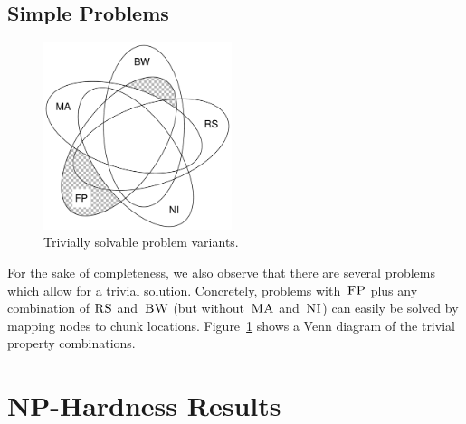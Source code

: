 \documentclass[preprint,12pt]{elsarticle}
\newcommand{\CC}{\textsc{NI}}
\newcommand{\FP}{\textsc{FP}}
\newcommand{\RS}{\textsc{RS}}
\newcommand{\BW}{\textsc{BW}}
\newcommand{\MA}{\textsc{MA}}
\begin{document}



\subsection{Simple Problems}

\begin{figure}
\centering
\includegraphics[width=0.49\textwidth]{figs/venn_trivial.pdf}
\caption{Trivially solvable problem variants.}
\label{fig:venn_trivial}
\end{figure}


For the sake of completeness, we also observe that there are
several problems which
allow for a trivial solution. Concretely, problems with~$\FP$
plus any combination of
$\RS$ and~$\BW$ (but without~$\MA$ and~$\CC$) can easily be solved by
mapping
nodes to chunk locations.
Figure~\ref{fig:venn_trivial}
shows a Venn diagram of the trivial property combinations.

\section{NP-Hardness Results}\label{sec:np}
\end{document}
